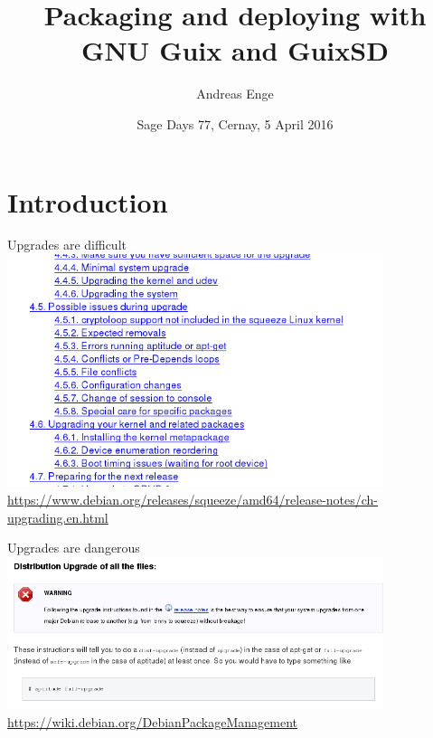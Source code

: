 \documentclass [t]{beamer}
\begin{document}
\title [GNU Guix]{Packaging and deploying with GNU Guix and GuixSD}
\author {Andreas Enge}
\date [Sage Days 2016]{\color {gruen}Sage Days 77,
Cernay, 5 April 2016
}


\begin {frame}{}
\maketitle
\end {frame}


\setcounter {framenumber}{0}

\section* {Introduction}

\begin {frame}{Upgrades are difficult}
\includegraphics [width=11cm]{images/debian-upgrade-instructions.png}
\vfill
\tiny
\hfill \url {https://www.debian.org/releases/squeeze/amd64/release-notes/ch-upgrading.en.html}
\end {frame}


\begin {frame}{Upgrades are dangerous}
\includegraphics [width=11cm]{images/debian-upgrade-warning.png}
\vfill
\tiny
\hfill \url {https://wiki.debian.org/DebianPackageManagement}
\end {frame}
\end{document}
